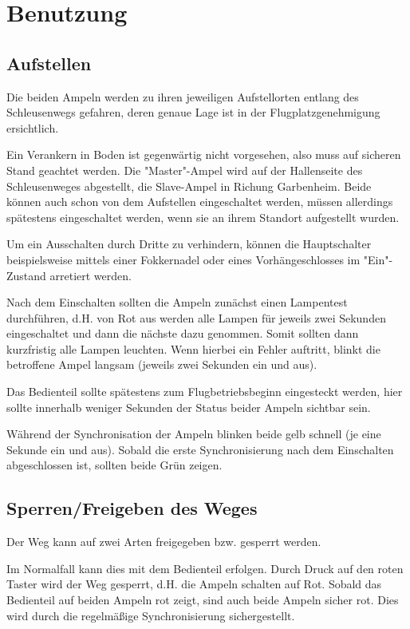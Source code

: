 \documentclass[a4paper, ngerman]{scrartcl}
\begin{document}
\section{Benutzung}
\subsection{Aufstellen}
Die beiden Ampeln werden zu ihren jeweiligen Aufstellorten entlang des Schleusenwegs gefahren, deren genaue Lage ist in der Flugplatzgenehmigung ersichtlich.

Ein Verankern in Boden ist gegenwärtig nicht vorgesehen, also muss auf sicheren Stand geachtet werden. Die "{}Master"{}-Ampel wird auf der Hallenseite des Schleusenweges abgestellt, die Slave-Ampel in Richung Garbenheim. Beide können auch schon von dem Aufstellen eingeschaltet werden, müssen allerdings spätestens eingeschaltet werden, wenn sie an ihrem Standort aufgestellt wurden.

Um ein Ausschalten durch Dritte zu verhindern, können die Hauptschalter beispielsweise mittels einer Fokkernadel oder eines Vorhängeschlosses im "{}Ein"{}-Zustand arretiert werden.

Nach dem Einschalten sollten die Ampeln zunächst einen Lampentest durchführen, d.H. von Rot aus werden alle Lampen für jeweils zwei Sekunden eingeschaltet und dann die nächste dazu genommen. Somit sollten dann kurzfristig alle Lampen leuchten. Wenn hierbei ein Fehler auftritt, blinkt die betroffene Ampel langsam (jeweils zwei Sekunden ein und aus).

Das Bedienteil sollte spätestens zum Flugbetriebsbeginn eingesteckt werden, hier sollte innerhalb weniger Sekunden der Status beider Ampeln sichtbar sein.

Während der Synchronisation der Ampeln blinken beide gelb schnell (je eine Sekunde ein und aus). Sobald die erste Synchronisierung nach dem Einschalten abgeschlossen ist, sollten beide Grün zeigen.

\subsection{Sperren/Freigeben des Weges}
Der Weg kann auf zwei Arten freigegeben bzw. gesperrt werden.

Im Normalfall kann dies mit dem Bedienteil erfolgen. Durch Druck auf den roten Taster wird der Weg gesperrt, d.H. die Ampeln schalten auf Rot.  Sobald das Bedienteil auf beiden Ampeln rot zeigt, sind auch beide Ampeln sicher rot. Dies wird durch die regelmäßige Synchronisierung sichergestellt.
\end{document}
